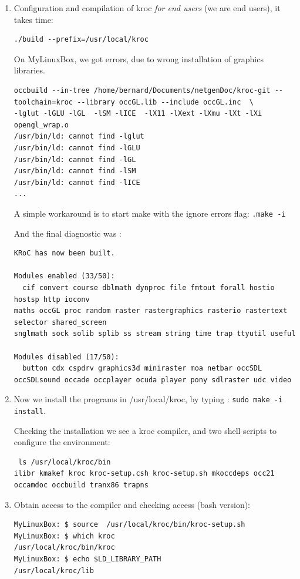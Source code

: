 \documentclass[times]{book}
\begin{document}
\begin{enumerate}
\item Configuration and compilation of kroc {\sl for end users} (we are end users),  it takes time:



\begin{lstlisting}  
./build --prefix=/usr/local/kroc
\end{lstlisting}  

On MyLinuxBox, we got errors, due to wrong  installation of graphics libraries.
\begin{lstlisting} 
occbuild --in-tree /home/bernard/Documents/netgenDoc/kroc-git --toolchain=kroc --library occGL.lib --include occGL.inc  \
-lglut -lGLU -lGL  -lSM -lICE  -lX11 -lXext -lXmu -lXt -lXi    opengl_wrap.o
/usr/bin/ld: cannot find -lglut
/usr/bin/ld: cannot find -lGLU
/usr/bin/ld: cannot find -lGL
/usr/bin/ld: cannot find -lSM
/usr/bin/ld: cannot find -lICE
...
\end{lstlisting} 

A simple workaround is to start make with the ignore errors flag:
{\tt .make -i
}

And the final diagnostic was :
\begin{lstlisting} 
KRoC has now been built.

Modules enabled (33/50):
  cif convert course dblmath dynproc file fmtout forall hostio hostsp http ioconv 
maths occGL proc random raster rastergraphics rasterio rastertext selector shared_screen 
snglmath sock solib splib ss stream string time trap ttyutil useful

Modules disabled (17/50):
  button cdx cspdrv graphics3d miniraster moa netbar occSDL occSDLsound occade occplayer ocuda player pony sdlraster udc video
\end{lstlisting} 


\item Now we install the programs in /usr/local/kroc,  by typing : {\tt sudo make -i install}.

Checking the installation we see a kroc compiler, and two shell scripts to configure the environment:
\begin{lstlisting} 
 ls /usr/local/kroc/bin
ilibr kmakef kroc kroc-setup.csh kroc-setup.sh mkoccdeps occ21 occamdoc occbuild tranx86 trapns
\end{lstlisting} 

\item Obtain access to the compiler and checking access (bash version):
\begin{lstlisting} 
MyLinuxBox: $ source  /usr/local/kroc/bin/kroc-setup.sh
MyLinuxBox: $ which kroc
/usr/local/kroc/bin/kroc 
MyLinuxBox: $ echo $LD_LIBRARY_PATH
/usr/local/kroc/lib
\end{lstlisting} 


\end{enumerate}
\end{document}
